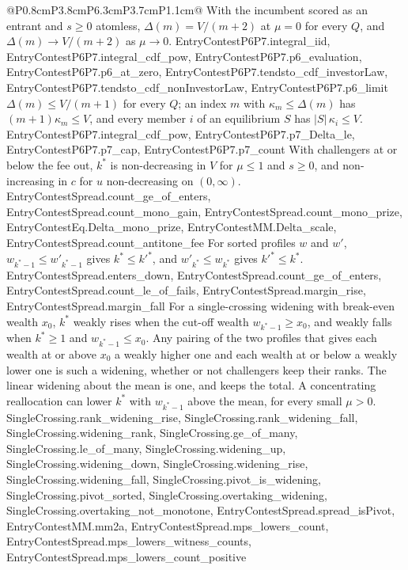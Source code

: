 \begin{longtable}{@{}P{0.8cm}P{3.8cm}P{6.3cm}P{3.7cm}P{1.1cm}@{}}
  {With the incumbent scored as an entrant and $s\ge0$ atomless, $\Delta(m)=V/(m+2)$ at $\mu=0$
  for every $Q$, and $\Delta(m)\to V/(m+2)$ as $\mu\to0$.}
  {EntryContestP6P7.integral_iid, EntryContestP6P7.integral_cdf_pow, EntryContestP6P7.p6_evaluation, EntryContestP6P7.p6_at_zero, EntryContestP6P7.tendsto_cdf_investorLaw, EntryContestP6P7.tendsto_cdf_nonInvestorLaw, EntryContestP6P7.p6_limit}
  {$\Delta(m)\le V/(m+1)$ for every $Q$; an index $m$ with $\kappa_m\le\Delta(m)$
  has $(m+1)\kappa_m\le V$, and every member $i$ of an equilibrium $S$ has
  $|S|\,\kappa_i\le V$.}
  {EntryContestP6P7.integral_cdf_pow, EntryContestP6P7.p7_Delta_le, EntryContestP6P7.p7_cap, EntryContestP6P7.p7_count}
  {With challengers at or below the fee out, $k^*$ is non-decreasing in $V$ for
  $\mu\le1$ and $s\ge0$, and non-increasing in $c$ for $u$ non-decreasing on
  $(0,\infty)$.}
  {EntryContestSpread.count_ge_of_enters, EntryContestSpread.count_mono_gain, EntryContestSpread.count_mono_prize, EntryContestEq.Delta_mono_prize, EntryContestMM.Delta_scale, EntryContestSpread.count_antitone_fee}
  {For sorted profiles $w$ and $w'$, $w_{k^*-1}\le w'_{k^*-1}$ gives $k^*\le k'^*$, and
  $w'_{k^*}\le w_{k^*}$ gives $k'^*\le k^*$.}
  {EntryContestSpread.enters_down, EntryContestSpread.count_ge_of_enters, EntryContestSpread.count_le_of_fails, EntryContestSpread.margin_rise, EntryContestSpread.margin_fall}
  {For a single-crossing widening with break-even wealth $x_0$, $k^*$ weakly
  rises when the cut-off wealth $w_{k^*-1}\ge x_0$, and weakly falls when
  $k^*\ge1$ and $w_{k^*-1}\le x_0$. Any pairing of the two profiles that gives
  each wealth at or above $x_0$ a weakly higher one and each wealth at or below
  a weakly lower one is such a widening, whether or not challengers keep their
  ranks. The linear widening
  about the mean is one, and keeps the total. A concentrating reallocation can
  lower $k^*$ with $w_{k^*-1}$ above the mean, for every small $\mu>0$.}
  {SingleCrossing.rank_widening_rise, SingleCrossing.rank_widening_fall, SingleCrossing.widening_rank, SingleCrossing.ge_of_many, SingleCrossing.le_of_many, SingleCrossing.widening_up, SingleCrossing.widening_down, SingleCrossing.widening_rise, SingleCrossing.widening_fall, SingleCrossing.pivot_is_widening, SingleCrossing.pivot_sorted, SingleCrossing.overtaking_widening, SingleCrossing.overtaking_not_monotone, EntryContestSpread.spread_isPivot, EntryContestMM.mm2a, EntryContestSpread.mps_lowers_count, EntryContestSpread.mps_lowers_witness_counts, EntryContestSpread.mps_lowers_count_positive}

\end{longtable}
